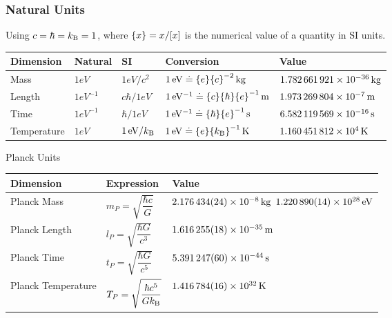 		\subsubsection{Natural Units}
			Using $c=\hbar=k_{\text{B}}=1$, where $\qty{x}=x/\qty[x]$ is the numerical value of a quantity in SI units.
			\begin{center}
				\begin{tabular}{| L{.14\textwidth} L{.1\textwidth} L{.1\textwidth} L{.25\textwidth} L{.25\textwidth} |}
					\hline
					Dimension & Natural & SI & Conversion & Value \\ \hline \hline
					Mass & $1\unit{eV}$ & $1\unit{eV} / c^2$ & $1\,\mathrm{eV}\doteq \qty{e}\qty{c}^{-2}\,\mathrm{kg}$ & $1.782\,661\,921\times 10^{-36}\,\mathrm{kg}$ \\ \hline
					Length & $1\unit{eV^{-1}}$ & $c \hbar / 1 \unit{eV}$ & $1\,\mathrm{eV^{-1}}\doteq \qty{c}\qty{\hbar}\qty{e}^{-1}\,\mathrm{m}$ & $1.973\,269\,804\times 10^{-7}\,\mathrm{m}$ \\ \hline
					Time & $1\unit{eV^{-1}}$ & $\hbar / 1 \unit{eV}$ & $1\,\mathrm{eV^{-1}}\doteq \qty{\hbar}\qty{e}^{-1}\,\mathrm{s}$ & $6.582\,119\,569\times 10^{-16}\,\mathrm{s}$ \\ \hline
					Temperature & $1\unit{eV}$ & $1\,\mathrm{eV} / k_{\text{B}}$ & $1\,\mathrm{eV}\doteq \qty{e}\qty{k_{\text{B}}}^{-1}\,\mathrm{K}$ & $1.160\,451\,812\times 10^{4}\,\mathrm{K}$ \\ \hline
				\end{tabular}
			\end{center}

			\noindent
			Planck Units
			\begin{center}
				\begin{tabular}{| L{.25\textwidth} L{.2\textwidth} L{.25\textwidth} |}
					\hline
					Dimension & Expression & Value \\ \hline \hline
					Planck Mass & $m_P = \sqrt{\dfrac{\hbar c}{G}}$ & $2.176\,434(24)\times 10^{-8}\,\mathrm{kg}$  $1.220\,890(14)\times 10^{28}\,\mathrm{eV}$  \\ \hline
					Planck Length & $l_P = \sqrt{\dfrac{\hbar G}{c^3}}$ & $1.616\,255(18)\times 10^{-35}\,\mathrm{m}$ \\ \hline
					Planck Time & $t_P = \sqrt{\dfrac{\hbar G}{c^5}}$ & $5.391\,247(60)\times 10^{-44}\,\mathrm{s}$ \\ \hline
					Planck Temperature & $T_P = \sqrt{\dfrac{\hbar c^5}{G k_{\text{B}}}}$ & $1.416\,784(16)\times 10^{32}\,\mathrm{K}$ \\ \hline
				\end{tabular}
			\end{center}
